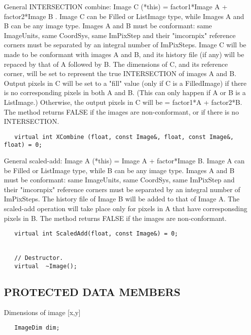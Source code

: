       General INTERSECTION combine: Image C (*this) = factor1*Image A + 
      factor2*Image B . Image C can be Filled or ListImage type, while
      Images A and B can be any image type. Images A and B must be 
      conformant: same ImageUnits, same CoordSys, same ImPixStep and
      their "imcornpix" reference corners must be separated by an
      integral number of ImPixSteps. Image C will be made to be conformant
      with images A and B, and its history file (if any) will be repaced
      by that of A followed by B. The dimensions of C, and its reference
      corner, will be set to represent the true INTERSECTION of images A and B.
      Output pixels in C will be set to a "fill" value (only if C is
      a FilledImage) if there is no corresponding pixels in both A and B.
      (This can only happen if A or B is a ListImage.) Otherwise, the output 
      pixels in C will be = factor1*A + factor2*B. The method returns
      FALSE if the images are non-conformant, or if there is no INTERSECTION.
\begin{verbatim}
   virtual int XCombine (float, const Image&, float, const Image&, float) = 0;

\end{verbatim}

      General scaled-add: Image A (*this) = Image A + factor*Image B. Image A
      can be Filled or ListImage type, while B can be any image type. Images A 
      and B must be conformant: same ImageUnits, same CoordSys, same ImPixStep 
      and their "imcornpix" reference corners must be separated by an
      integral number of ImPixSteps. The history file of Image B will be
      added to that of Image A. The scaled-add operation will take place only
      for pixels in A that have corresponsding pixels in B. The method returns
      FALSE if the images are non-conformant.
\begin{verbatim}
   virtual int ScaledAdd(float, const Image&) = 0;


   // Destructor.
   virtual  ~Image();

\end{verbatim}

\subsection*{PROTECTED DATA MEMBERS}

      Dimensions of image [x,y]
\begin{verbatim}
   ImageDim dim;
\end{verbatim}

